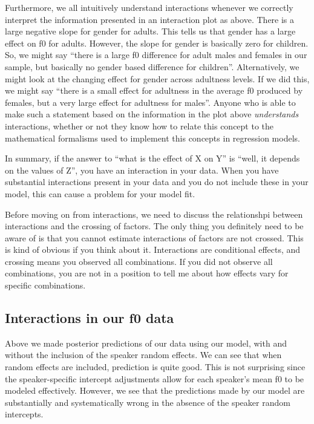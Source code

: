 \documentclass[
]{book}
\begin{document}
Furthermore, we all intuitively understand interactions whenever we correctly interpret the information presented in an interaction plot as above. There is a large negative slope for gender for adults. This tells us that gender has a large effect on f0 for adults. However, the slope for gender is basically zero for children. So, we might say ``there is a large f0 difference for adult males and females in our sample, but basically no gender based difference for children''. Alternatively, we might look at the changing effect for gender across adultness levels. If we did this, we might say ``there is a small effect for adultness in the average f0 produced by females, but a very large effect for adultness for males''. Anyone who is able to make such a statement based on the information in the plot above \emph{understands} interactions, whether or not they know how to relate this concept to the mathematical formalisms used to implement this concepts in regression models.

In summary, if the answer to ``what is the effect of X on Y'' is ``well, it depends on the values of Z'', you have an interaction in your data. When you have substantial interactions present in your data and you do not include these in your model, this can cause a problem for your model fit.

Before moving on from interactions, we need to discuss the relationshpi between interactions and the crossing of factors. The only thing you definitely need to be aware of is that you cannot estimate interactions of factors are not crossed. This is kind of obvious if you think about it. Interactions are conditional effects, and crossing means you observed all combinations. If you did not observe all combinations, you are not in a position to tell me about how effects vary for specific combinations.

\hypertarget{interactions-in-our-f0-data}{%
\subsection{Interactions in our f0 data}\label{interactions-in-our-f0-data}}

Above we made posterior predictions of our data using our model, with and without the inclusion of the speaker random effects. We can see that when random effects are included, prediction is quite good. This is not surprising since the speaker-specific intercept adjustments allow for each speaker's mean f0 to be modeled effectively. However, we see that the predictions made by our model are substantially and systematically wrong in the absence of the speaker random intercepts.
\end{document}
